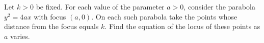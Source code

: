 Let $k>0$ be fixed. For each value of the parameter $a>0$, consider the parabola $y^2=4ax$ with focus $(a,0)$. On each such parabola take the points whose distance from the focus equals $k$. Find the equation of the locus of these points as $a$ varies.
